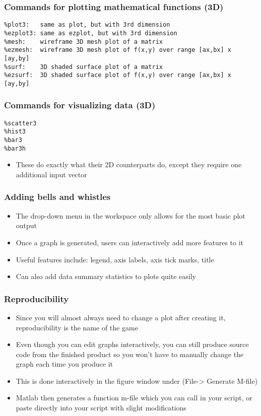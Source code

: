 \documentclass[english,xcolor=dvipsnames]{beamer}
\newcommand{\bi}{\begin{itemize}}
\newcommand{\ei}{\end{itemize}}
\begin{document}
\begin{frame}[fragile]
\frametitle{Commands for plotting mathematical functions (3D)}
\begin{lstlisting}
%plot3:   same as plot, but with 3rd dimension
%ezplot3: same as ezplot, but with 3rd dimension
%mesh:    wireframe 3D mesh plot of a matrix
%ezmesh:  wireframe 3D mesh plot of f(x,y) over range [ax,bx] x [ay,by]
%surf:    3D shaded surface plot of a matrix
%ezsurf:  3D shaded surface plot of f(x,y) over range [ax,bx] x [ay,by]
\end{lstlisting}
\end{frame}

\begin{frame}[fragile]
\frametitle{Commands for visualizing data (3D)}
\begin{lstlisting}
%scatter3
%hist3
%bar3
%bar3h
\end{lstlisting}
\bi
\item These do exactly what their 2D counterparts do, except they require one additional input vector
\ei
\end{frame}

\begin{frame}
\frametitle{Adding bells and whistles}
   \bi 
   \item The drop-down menu in the workspace only allows for the most basic plot output
   \item Once a graph is generated, users can interactively add more features to it
   \item Useful features include: legend, axis labels, axis tick marks, title
   \item Can also add data summary statistics to plots quite easily
   \ei
\end{frame}

\begin{frame}
\frametitle{Reproducibility}
   \bi 
   \item Since you will almost always need to change a plot after creating it, reproducibility is the name of the game
   \item Even though you can edit graphs interactively, you can still produce source code from the finished product so you won't have to manually change the graph each time you produce it
   \item This is done interactively in the figure window under (File-> Generate M-file)
   \item Matlab then generates a function m-file which you can call in your script, or paste directly into your script with slight modifications
   \ei
\end{frame}
\end{document}
